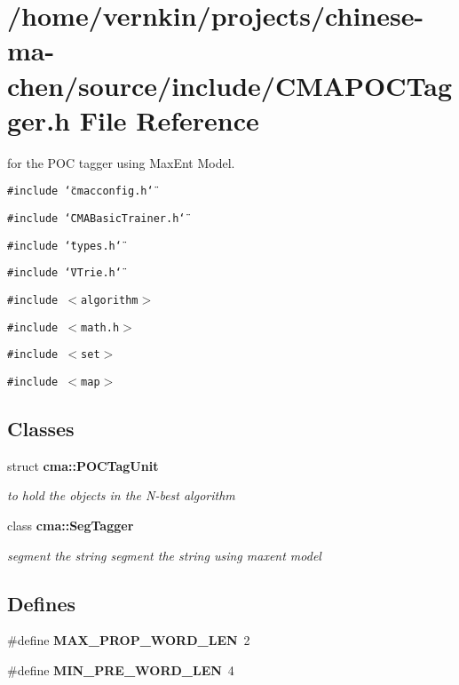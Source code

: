 \section{/home/vernkin/projects/chinese-ma-chen/source/include/CMAPOCTagger.h File Reference}
\label{CMAPOCTagger_8h}
for the POC tagger using MaxEnt Model.  


{\tt \#include \char`\"{}cmacconfig.h\char`\"{}}\par
{\tt \#include \char`\"{}CMABasicTrainer.h\char`\"{}}\par
{\tt \#include \char`\"{}types.h\char`\"{}}\par
{\tt \#include \char`\"{}VTrie.h\char`\"{}}\par
{\tt \#include $<$algorithm$>$}\par
{\tt \#include $<$math.h$>$}\par
{\tt \#include $<$set$>$}\par
{\tt \#include $<$map$>$}\par
\subsection*{Classes}
\begin{CompactItemize}
\item 
struct {\bf cma::POCTagUnit}
\begin{CompactList}\small\item\em to hold the objects in the N-best algorithm \item\end{CompactList}\item 
class {\bf cma::SegTagger}
\begin{CompactList}\small\item\em segment the string segment the string using maxent model \item\end{CompactList}\end{CompactItemize}
\subsection*{Defines}
\begin{CompactItemize}
\item 
\#define {\bf MAX\_\-PROP\_\-WORD\_\-LEN}~2
\item 
\#define {\bf MIN\_\-PRE\_\-WORD\_\-LEN}~4
\end{CompactItemize}
